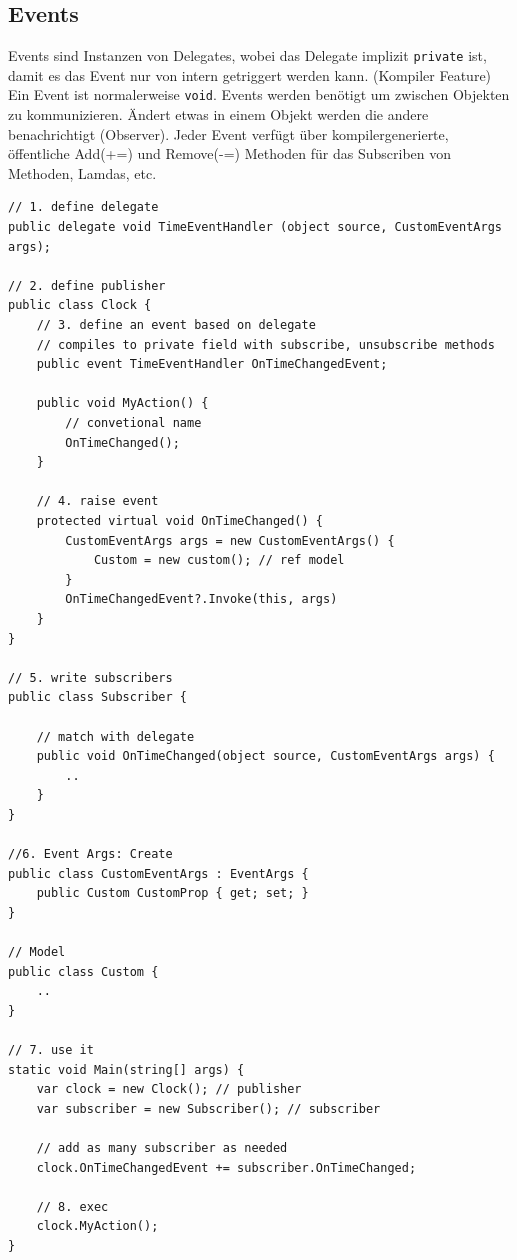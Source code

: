 \subsection{Events}
Events sind Instanzen von Delegates, wobei das Delegate  implizit \lstinline|private| ist, damit es das Event nur von intern getriggert werden kann. (Kompiler Feature) Ein Event ist normalerweise \lstinline|void|. Events werden benötigt um zwischen Objekten zu kommunizieren. Ändert etwas in einem Objekt werden die andere benachrichtigt (Observer). Jeder Event verfügt über kompilergenerierte, öffentliche Add(+=) und Remove(-=) Methoden für das Subscriben von Methoden, Lamdas, etc.
\begin{lstlisting}
// 1. define delegate
public delegate void TimeEventHandler (object source, CustomEventArgs args);

// 2. define publisher
public class Clock {
	// 3. define an event based on delegate
	// compiles to private field with subscribe, unsubscribe methods
	public event TimeEventHandler OnTimeChangedEvent;
	
	public void MyAction() {
		// convetional name
		OnTimeChanged();
	}
	
	// 4. raise event
	protected virtual void OnTimeChanged() {
		CustomEventArgs args = new CustomEventArgs() {
			Custom = new custom(); // ref model
		}
		OnTimeChangedEvent?.Invoke(this, args)
	}
}

// 5. write subscribers
public class Subscriber {
	
	// match with delegate
	public void OnTimeChanged(object source, CustomEventArgs args) {
		.. 
	}
}

//6. Event Args: Create 
public class CustomEventArgs : EventArgs {
	public Custom CustomProp { get; set; }
}

// Model
public class Custom {
	..
}

// 7. use it
static void Main(string[] args) {
	var clock = new Clock(); // publisher
	var subscriber = new Subscriber(); // subscriber
	
	// add as many subscriber as needed
	clock.OnTimeChangedEvent += subscriber.OnTimeChanged;
	
	// 8. exec
	clock.MyAction();
}
\end{lstlisting}

